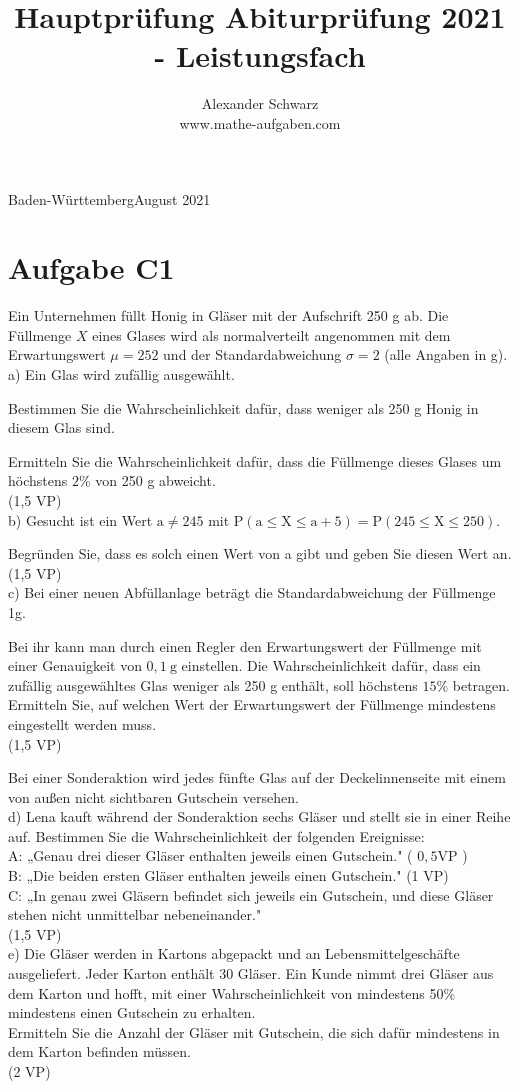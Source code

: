 \documentclass[10pt]{article}
\title{Hauptprüfung Abiturprüfung 2021 - Leistungsfach }
\author{Alexander Schwarz\\
www.mathe-aufgaben.com}
\date{}
\begin{document}
\maketitle
 Baden-WürttembergAugust 2021

\section*{Aufgabe C1}
Ein Unternehmen füllt Honig in Gläser mit der Aufschrift 250 g ab. Die Füllmenge $X$ eines Glases wird als normalverteilt angenommen mit dem Erwartungswert $\mu=252$ und der Standardabweichung $\sigma=2$ (alle Angaben in g).\\
a) Ein Glas wird zufällig ausgewählt.

Bestimmen Sie die Wahrscheinlichkeit dafür, dass weniger als 250 g Honig in diesem Glas sind.

Ermitteln Sie die Wahrscheinlichkeit dafür, dass die Füllmenge dieses Glases um höchstens $2 \%$ von 250 g abweicht.\\
(1,5 VP)\\
b) Gesucht ist ein Wert $\mathrm{a} \neq 245$ mit $\mathrm{P}(\mathrm{a} \leq \mathrm{X} \leq \mathrm{a}+5)=\mathrm{P}(245 \leq \mathrm{X} \leq 250)$.

Begründen Sie, dass es solch einen Wert von a gibt und geben Sie diesen Wert an.\\
(1,5 VP)\\
c) Bei einer neuen Abfüllanlage beträgt die Standardabweichung der Füllmenge 1g.

Bei ihr kann man durch einen Regler den Erwartungswert der Füllmenge mit einer Genauigkeit von $0,1 \mathrm{~g}$ einstellen. Die Wahrscheinlichkeit dafür, dass ein zufällig ausgewähltes Glas weniger als 250 g enthält, soll höchstens $15 \%$ betragen. Ermitteln Sie, auf welchen Wert der Erwartungswert der Füllmenge mindestens eingestellt werden muss.\\
(1,5 VP)

Bei einer Sonderaktion wird jedes fünfte Glas auf der Deckelinnenseite mit einem von außen nicht sichtbaren Gutschein versehen.\\
d) Lena kauft während der Sonderaktion sechs Gläser und stellt sie in einer Reihe auf. Bestimmen Sie die Wahrscheinlichkeit der folgenden Ereignisse:\\
A: „Genau drei dieser Gläser enthalten jeweils einen Gutschein." ( $0,5 \mathrm{VP}$ )\\
B: „Die beiden ersten Gläser enthalten jeweils einen Gutschein." (1 VP)\\
C: „In genau zwei Gläsern befindet sich jeweils ein Gutschein, und diese Gläser stehen nicht unmittelbar nebeneinander."\\
(1,5 VP)\\
e) Die Gläser werden in Kartons abgepackt und an Lebensmittelgeschäfte ausgeliefert. Jeder Karton enthält 30 Gläser. Ein Kunde nimmt drei Gläser aus dem Karton und hofft, mit einer Wahrscheinlichkeit von mindestens 50\% mindestens einen Gutschein zu erhalten.\\
Ermitteln Sie die Anzahl der Gläser mit Gutschein, die sich dafür mindestens in dem Karton befinden müssen.\\
(2 VP)
\end{document}
